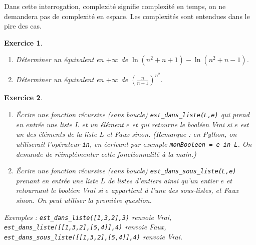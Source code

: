 \documentclass[11pt,a4paper]{article}
\newtheorem{ex}{Exercice}
\begin{document}
\bigskip




Dans cette interrogation, \og complexité\fg{} signifie \og complexité en temps\fg, on ne demandera pas de complexité en espace. Les complexités sont entendues dans le pire des cas.



\begin{ex}\label{equivalents}
\begin{enumerate}
\item Déterminer un équivalent  en $+\infty$ de $\ln(n^2+n+1)-\ln(n^2+n-1)$.
\item Déterminer un équivalent en $+\infty$ de $\left(\frac{n}{n+1}\right)^{n^2}$.
\end{enumerate}
\end{ex}




\begin{ex}\label{est_dans}
\begin{enumerate}
\item Écrire une fonction récursive (sans boucle) \verb+est_dans_liste(L,e)+ qui prend en entrée une liste $L$ et un élément $e$ et qui retourne le booléen Vrai si $e$ est un des éléments de la liste $L$ et Faux sinon.
(Remarque : en Python, on utiliserait l'opérateur \og \verb+in+\fg{}, en écrivant par exemple \verb+monBooleen = e in L+. On demande de réimplémenter cette fonctionnalité à la main.)
\item Écrire une fonction récursive (sans boucle) \verb+est_dans_sous_liste(L,e)+ prenant en entrée une liste $L$ de listes d'entiers ainsi qu'un entier $e$ et retournant le booléen Vrai si $e$ appartient à l'une des sous-listes, et Faux sinon. On peut utiliser la première question.
\end{enumerate}
Exemples : \verb+est_dans_liste([1,3,2],3)+ renvoie Vrai, \verb+est_dans_liste([[1,3,2],[5,4]],4)+ renvoie Faux, \verb+est_dans_sous_liste([[1,3,2],[5,4]],4)+ renvoie Vrai.
\end{ex}
\end{document}
